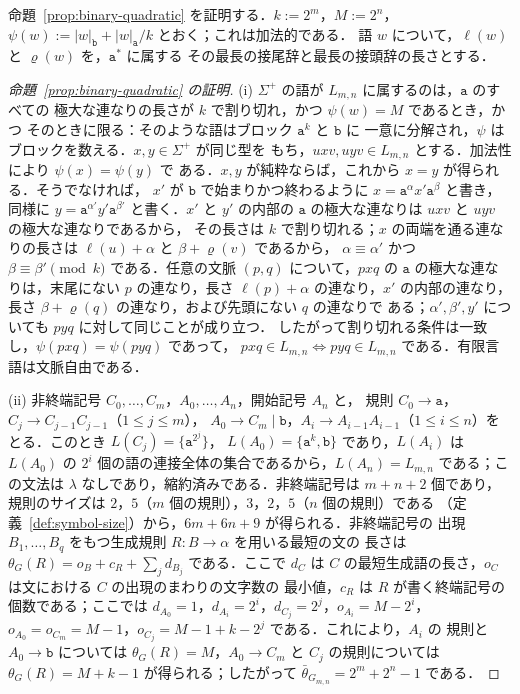 \documentclass[11pt,a4paper]{ltjsarticle}
\numberwithin{equation}{section}
\theoremstyle{plain}
\theoremstyle{definition}
\theoremstyle{remark}
\theoremstyle{plain}
\begin{document}
命題~\ref{prop:binary-quadratic} を証明する．$k:=2^m$，$M:=2^n$，
$\psi(w):=|w|_{\mathtt b}+|w|_{\mathtt a}/k$ とおく；これは加法的である．
語 $w$ について，$\ell(w)$ と $\varrho(w)$ を，$\mathtt a^*$ に属する
その最長の接尾辞と最長の接頭辞の長さとする．

\begin{proof}[命題~\ref{prop:binary-quadratic} の証明]
(i) $\Sigma^+$ の語が $L_{m,n}$ に属するのは，$\mathtt a$ のすべての
極大な連なりの長さが $k$ で割り切れ，かつ $\psi(w)=M$ であるとき，かつ
そのときに限る：そのような語はブロック $\mathtt a^k$ と $\mathtt b$ に
一意に分解され，$\psi$ はブロックを数える．$x,y\in\Sigma^+$ が同じ型を
もち，$uxv,uyv\in L_{m,n}$ とする．加法性により $\psi(x)=\psi(y)$ で
ある．$x,y$ が純粋ならば，これから $x=y$ が得られる．そうでなければ，
$x'$ が $\mathtt b$ で始まりかつ終わるように
$x=\mathtt a^{\alpha}x'\mathtt a^{\beta}$ と書き，同様に
$y=\mathtt a^{\alpha'}y'\mathtt a^{\beta'}$ と書く．$x'$ と $y'$ の内部の
$\mathtt a$ の極大な連なりは $uxv$ と $uyv$ の極大な連なりであるから，
その長さは $k$ で割り切れる；$x$ の両端を通る連なりの長さは
$\ell(u)+\alpha$ と $\beta+\varrho(v)$ であるから，
$\alpha\equiv\alpha'$ かつ $\beta\equiv\beta'\pmod k$ である．任意の文脈
$(p,q)$ について，$pxq$ の $\mathtt a$ の極大な連なりは，末尾にない
$p$ の連なり，長さ $\ell(p)+\alpha$ の連なり，$x'$ の内部の連なり，
長さ $\beta+\varrho(q)$ の連なり，および先頭にない $q$ の連なりで
ある；$\alpha',\beta',y'$ についても $pyq$ に対して同じことが成り立つ．
したがって割り切れる条件は一致し，$\psi(pxq)=\psi(pyq)$ であって，
$pxq\in L_{m,n}\iff pyq\in L_{m,n}$ である．有限言語は文脈自由である．

(ii) 非終端記号 $C_0,\ldots,C_m$，$A_0,\ldots,A_n$，開始記号 $A_n$ と，
規則 $C_0\to\mathtt a$，$C_j\to C_{j-1}C_{j-1}$（$1\le j\le m$），
$A_0\to C_m\mid\mathtt b$，$A_i\to A_{i-1}A_{i-1}$（$1\le i\le n$）を
とる．このとき $L(C_j)=\{\mathtt a^{2^j}\}$，
$L(A_0)=\{\mathtt a^k,\mathtt b\}$ であり，$L(A_i)$ は $L(A_0)$ の $2^i$
個の語の連接全体の集合であるから，$L(A_n)=L_{m,n}$ である；この文法は
$\lambda$ なしであり，縮約済みである．非終端記号は $m+n+2$ 個であり，規則のサイズは
$2$，$5$（$m$ 個の規則），$3$，$2$，$5$（$n$ 個の規則）である
（定義~\ref{def:symbol-size}）から，$6m+6n+9$ が得られる．非終端記号の
出現 $B_1,\ldots,B_q$ をもつ生成規則 $R:B\to\alpha$ を用いる最短の文の
長さは $\theta_G(R)=o_B+c_R+\sum_jd_{B_j}$ である．ここで $d_C$ は $C$
の最短生成語の長さ，$o_C$ は文における $C$ の出現のまわりの文字数の
最小値，$c_R$ は $R$ が書く終端記号の個数である；ここでは
$d_{A_0}=1$，$d_{A_i}=2^i$，$d_{C_j}=2^j$，$o_{A_i}=M-2^i$，
$o_{A_0}=o_{C_m}=M-1$，$o_{C_j}=M-1+k-2^j$ である．これにより，$A_i$ の
規則と $A_0\to\mathtt b$ については $\theta_G(R)=M$，$A_0\to C_m$ と
$C_j$ の規則については $\theta_G(R)=M+k-1$ が得られる；したがって
$\bar\theta_{G_{m,n}}=2^m+2^n-1$ である．


\end{proof}
\end{document}
